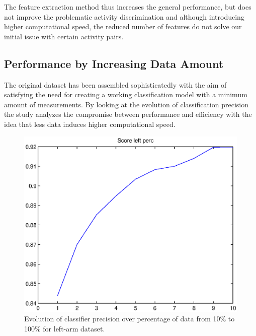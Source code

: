 \documentclass{sig-alternate}
\begin{document}
The feature extraction method thus increases the general performance, but does not improve the problematic activity discrimination and although introducing higher computational speed, the reduced number of features do not solve our initial issue with certain activity pairs.

\subsection{Performance by Increasing Data Amount}
The original dataset has been assembled sophisticatedly with the aim of satisfying the need for creating a working classification model with a minimum amount of measurements. By looking at the evolution of classification precision the study analyzes the compromise between performance and efficiency with the idea that less data induces higher computational speed.

\begin{figure}[t]
  \centering
  \includegraphics[scale=0.40]{./matlab_output/score_perc_left_3.eps}
  \caption{Evolution of classifier precision over percentage of data from 10\% to 100\% for left-arm dataset.}
  \label{fig:score_evo_left}
\end{figure}
\end{document}
